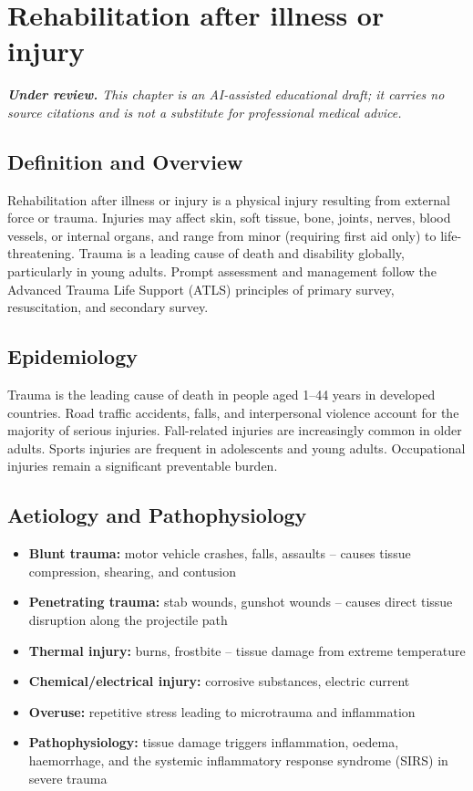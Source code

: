 \chapter{Rehabilitation after illness or injury}

\medskip
\noindent\textit{\textbf{Under review.} This chapter is an AI-assisted educational draft; it carries no source citations and is not a substitute for professional medical advice.}

\section*{Definition and Overview}
Rehabilitation after illness or injury is a physical injury resulting from external force or trauma. Injuries may affect skin, soft tissue, bone, joints, nerves, blood vessels, or internal organs, and range from minor (requiring first aid only) to life-threatening. Trauma is a leading cause of death and disability globally, particularly in young adults. Prompt assessment and management follow the Advanced Trauma Life Support (ATLS) principles of primary survey, resuscitation, and secondary survey.

\section*{Epidemiology}
Trauma is the leading cause of death in people aged 1--44 years in developed countries. Road traffic accidents, falls, and interpersonal violence account for the majority of serious injuries. Fall-related injuries are increasingly common in older adults. Sports injuries are frequent in adolescents and young adults. Occupational injuries remain a significant preventable burden.

\section*{Aetiology and Pathophysiology}
\begin{itemize}
    \item \textbf{Blunt trauma:} motor vehicle crashes, falls, assaults -- causes tissue compression, shearing, and contusion
    \item \textbf{Penetrating trauma:} stab wounds, gunshot wounds -- causes direct tissue disruption along the projectile path
    \item \textbf{Thermal injury:} burns, frostbite -- tissue damage from extreme temperature
    \item \textbf{Chemical/electrical injury:} corrosive substances, electric current
    \item \textbf{Overuse:} repetitive stress leading to microtrauma and inflammation
    \item \textbf{Pathophysiology:} tissue damage triggers inflammation, oedema, haemorrhage, and the systemic inflammatory response syndrome (SIRS) in severe trauma
\end{itemize}

